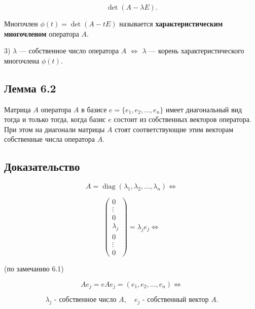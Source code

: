 {\[
\det(A - \lambda E).
\]



Многочлен \( \phi(t) = \det(A - tE) \) называется \textbf{характеристическим многочленом} оператора \( A \).

3) \( \lambda \) — собственное число оператора \( A \) \( \iff \) \( \lambda \) — корень характеристического многочлена \( \phi(t) \).

\subsection*{Лемма 6.2}

Матрица \( A \) оператора \( A \) в базисе \( e = \{e_1, e_2, \dots, e_n\} \) имеет диагональный вид тогда и только тогда, когда базис \( e \) состоит из собственных векторов оператора. При этом на диагонали матрицы \( A \) стоят соответствующие этим векторам собственные числа оператора \( A \).

\subsection*{Доказательство}



\[
A = \operatorname{diag} (\lambda_1, \lambda_2, \dots, \lambda_n) \iff
\]





\[
\begin{pmatrix}
0 \\
\vdots \\
0 \\
\lambda_j \\
0 \\
\vdots \\
0
\end{pmatrix} = \lambda_j e_j \iff
\]



(по замечанию 6.1)



\[
A e_j = e A e_j = (e_1, e_2, \dots, e_n) \iff
\]





\[
\lambda_j \text{ - собственное число } A, \quad e_j \text{ - собственный вектор } A.
\]




}